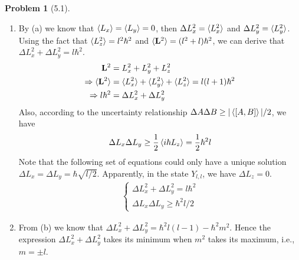 \documentclass[twoside,11pt]{article}
\theoremstyle{definition}
\newtheorem{problem}{Problem}
\theoremstyle{remark}
\begin{document}
\begin{problem}[5.1]
\begin{enumerate}[label=(\alph*)]
    \item By (a) we know that $\braket{L_x} = \braket{L_y}=0$, then $\Delta L_x^2 = \braket{L_x^2}$ 
    and $\Delta L_y^2 = \braket{L_y^2}$.
    Using the fact that $\braket{L_z^2} = l^2\hbar^2$ and $\braket{\mathbf{L}^2}=(l^2+l)\hbar^2$, we can derive that
    $\Delta L_x^2 + \Delta L_y^2=l\hbar^2$.
    \begin{align*}
        \mathbf{L}^2 &= L_x^2 + L_y^2 + L_z^2\\
        \Rightarrow
        \braket{\mathbf{L}^2} &= \braket{L_x^2} + \braket{L_y^2} + \braket{L_z^2} = l(l+1)\hbar^2  \\
        \Rightarrow l\hbar^2 &= \Delta L_x^2 + \Delta L_y^2
    \end{align*}
    Also, according to the uncertainty relationship $\Delta A\Delta B\geq |\braket{[A,B]}|/2$, we have
    \begin{align*}
        \Delta L_x\Delta L_y \geq \frac{1}{2} \braket{i\hbar L_z} = \frac{1}{2}\hbar^2l
    \end{align*}
    Note that the following set of equations could only have a unique solution
    $\Delta L_x=\Delta L_y=\hbar\sqrt{l/2}$.
    Apparently, in the state $Y_{l,l}$, we have $\Delta L_z = 0$.
    \begin{align*}
        \begin{cases}
            \Delta L_x^2 + \Delta L_y^2 = l\hbar^2\\
            \Delta L_x\Delta L_y \geq \hbar^2 l/2
        \end{cases}
    \end{align*}

    \item From (b) we know that $\Delta L_x^2 + \Delta L_y^2 = \hbar^2l(l-1) - \hbar^2m^2$.
    Hence the expression $\Delta L_x^2 + \Delta L_y^2$ takes its minimum when $m^2$ takes
    its maximum, i.e., $m=\pm l$.


\end{enumerate}
\end{problem}
\end{document}
